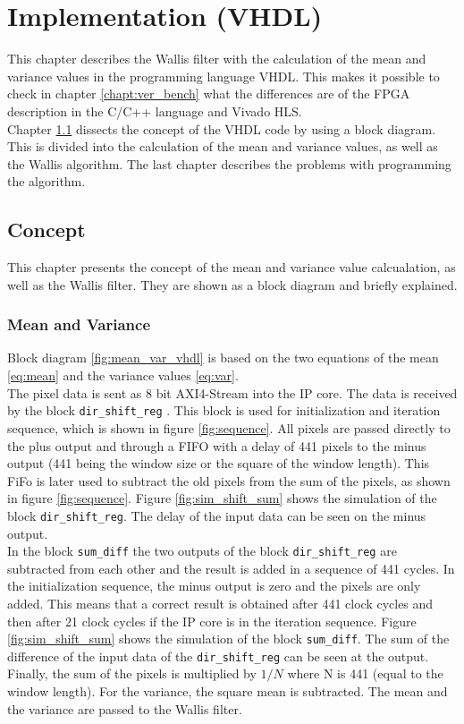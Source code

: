 \section{Implementation (VHDL)} \label{ch:ip:imp_vhdl}
This chapter describes the Wallis filter with the calculation of the mean and
variance values in the programming language VHDL. This makes it possible to
check in chapter \ref{chapt:ver_bench} what the differences are of the FPGA
description in the C/C++ language and Vivado HLS. \\
Chapter \ref{ch:concept_vhdl} dissects the concept of the VHDL code by using a
block diagram. This is divided into the calculation of the mean and variance
values, as well as the Wallis algorithm. The last chapter describes the
problems with programming the algorithm.

\subsection{Concept} \label{ch:concept_vhdl}
This chapter presents the concept of the mean and variance value
calcualation, as well as the Wallis filter. They are shown as a block diagram and briefly explained.

\subsubsection*{Mean and Variance}
Block diagram \ref{fig:mean_var_vhdl} is based on the two equations of the mean 
\ref{eq:mean} and the variance values \ref{eq:var}. \\
The pixel data is sent as 8 bit AXI4-Stream into the IP core. The data is
received by the block \texttt{dir\_shift\_reg} . This block is used for
initialization and iteration sequence, which is shown in figure 
\ref{fig:sequence}. All pixels are passed directly to the plus output and
through a FIFO with a delay of 441 pixels to the minus output (441 being the
window size or the
square of the window length). This FiFo is later used to subtract the
old pixels from the sum of the pixels, as shown in figure \ref{fig:sequence}.
Figure \ref{fig:sim_shift_sum}
shows the simulation of the block \texttt{dir\_shift\_reg}. The delay of the
input data can be seen on the minus output. \\
In the block \texttt{sum\_diff} the two outputs of the block 
\texttt{dir\_shift\_reg} are subtracted from each other and the result is
added in a sequence of 441 cycles. In the initialization sequence, the minus
output is zero and the pixels are only added. This means that a correct result
is obtained after 441 clock cycles and then after 21 clock cycles if the
IP core is in the iteration sequence. Figure \ref{fig:sim_shift_sum} shows the
simulation of the block \texttt{sum\_diff}. The sum of the difference of the
input data of the \texttt{dir\_shift\_reg} can be seen at the output.\\
Finally, the sum of the pixels is multiplied by $1/N$ where N is 441 (equal to
the window length). For the variance, the square mean is subtracted. The mean
and the variance are passed to the Wallis filter.

